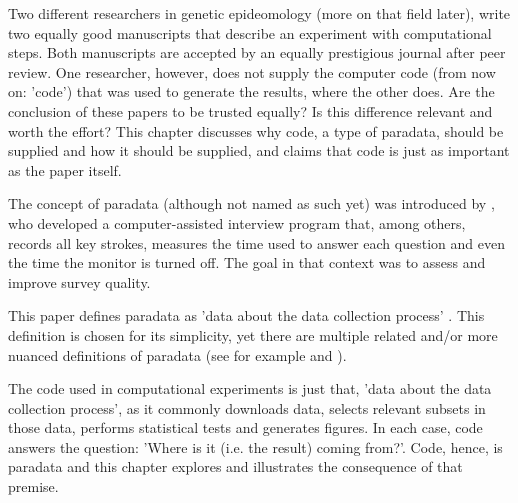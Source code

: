 
Two different researchers in genetic epideomology (more on that field later), 
write two equally good manuscripts
that describe an experiment with computational steps.
Both manuscripts are accepted by an equally prestigious journal after peer review. 
One researcher, however, does not supply the
computer code (from now on: 'code') that was used to generate the results,
where the other does.
Are the conclusion of these papers to be trusted equally?
Is this difference relevant and worth the effort?
This chapter discusses why code, a type of paradata, 
should be supplied
and how it should be supplied,
and claims that code is just as important as the paper itself.


The concept of paradata (although not named as such yet) 
was introduced by \cite{couper1998measuring},
who developed a computer-assisted interview program
that, among others, records all key strokes,
measures the time used to answer each question 
and even the time the monitor is turned off.
The goal in that context was to assess and improve survey quality.


This paper defines paradata as 'data about the data collection 
process' \cite{choumert2019using}.
This definition is chosen for its simplicity, 
yet there are multiple related and/or more nuanced 
definitions of paradata (see for example \cite{huvila2022improving} 
and \cite{skold2022interrogating}).


The code used in computational experiments is just that, 
'data about the data collection 
process', as it commonly downloads data,
selects relevant subsets in those data,
performs statistical tests and generates figures.
In each case, code answers the question: 
'Where is it (i.e. the result) coming from?'.
Code, hence, is paradata and this chapter explores and illustrates the
consequence of that premise.


